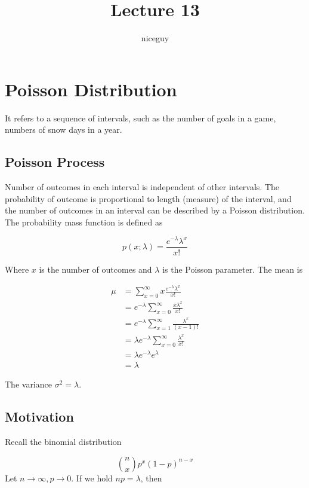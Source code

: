 \documentclass[12pt]{article}
\author{niceguy}
\title{Lecture 13}
\begin{document}
\maketitle

\section{Poisson Distribution}

It refers to a sequence of intervals, such as the number of goals in a game, numbers of snow days in a year.

\subsection{Poisson Process}

Number of outcomes in each interval is independent of other intervals. The probability of outcome is proportional to length (measure) of the interval, and the number of outcomes in an interval can be described by a Poisson distribution. The probability mass function is defined as

$$p(x;\lambda) = \frac{e^{-\lambda}\lambda^x}{x!}$$

Where $x$ is the number of outcomes and $\lambda$ is the Poisson parameter. The mean is

\begin{align*}
	\mu &= \sum_{x=0}^\infty x\frac{e^{-\lambda}\lambda^x}{x!} \\
	    &= e^{-\lambda}\sum_{x=0}^\infty \frac{x\lambda^x}{x!} \\
	    &= e^{-\lambda}\sum_{x=1}^\infty \frac{\lambda^x}{(x-1)!} \\
	    &= \lambda e^{-\lambda} \sum_{x=0}^\infty \frac{\lambda^x}{x!} \\
	    &= \lambda e^{-\lambda} e^{\lambda} \\
	    &= \lambda
\end{align*}

The variance $\sigma^2 = \lambda$.

\subsection{Motivation}

Recall the binomial distribution

$$\binom{n}{x}p^x(1-p)^{n-x}$$
Let $n\rightarrow\infty,p\rightarrow0$. If we hold $np = \lambda$, then
\end{document}
